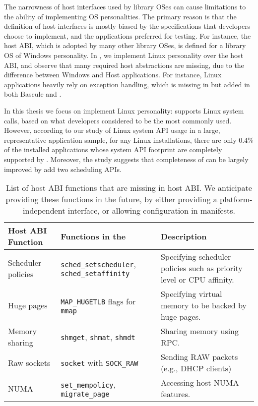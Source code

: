 The narrowness of host interfaces used by library OSes can cause limitations to the ability of implementing OS personalities.
The primary reason is that the definition of host interfaces
is mostly biased by the specifications that developers choose to implement,
and the applications preferred for testing.
For instance, the \drawbridge{} host ABI, which is adopted by many other library OSes,
is defined for a library OS of Windows personality.
In \graphene{}, we implement Linux personality over the \drawbridge{} host ABI,
and observe that many required host abstractions are missing,
due to the difference between Windows and Host applications.
For instance, Linux applications heavily rely on exception handling, which is missing in \drawbridge{} but added in both Bascule and \graphene{}.

In this thesis we focus on implement Linux personality:
\graphene{} supports \syscalls{} Linux system calls,
based on what developers considered to be the most commonly used.
However, according to our study of Linux system API usage in a large, representative application sample,
for any Linux installations,
there are only 0.4\% of the installed applications whose system API footprint
are completely supported by \graphene{}.
Moreover, the study suggests that completeness of \graphene{} can be largely improved by add two scheduling APIs.


\begin{table}[t]
\footnotesize
\centering
\begin{tabular}{|p{1.2in}|p{2.4in}|p{2.4in}|}
\hline
{\bf Host ABI Function} & {\bf Functions in the \libos{}} & {\bf Description} \\
\hline
Scheduler policies & {\tt sched\_setscheduler}, {\tt sched\_setaffinity} & Specifying scheduler policies such as priority level or CPU affinity.\\
\hline
Huge pages & {\tt MAP\_HUGETLB} flags for {\tt mmap} & Specifying virtual memory to be backed by huge pages. \\
\hline
Memory sharing & {\tt shmget}, {\tt shmat}, {\tt shmdt} & Sharing memory using RPC. \\
\hline
Raw sockets & {\tt socket} with {\tt SOCK\_RAW}  & Sending RAW packets (e.g., DHCP clients) \\
\hline
NUMA & {\tt set\_mempolicy}, {\tt migrate\_page} & Accessing host NUMA features. \\
\hline
\end{tabular}
\caption[List of host ABI functions to be added in \graphene{} as future works]
{List of host ABI functions that are missing in \graphene{} host ABI.
We anticipate providing these functions in the future,
by either providing a platform-independent interface,
or allowing configuration in manifests.}
\label{tab:future:abi}
\end{table}


